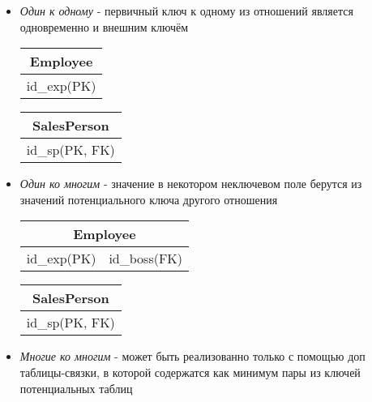 \documentclass[12pt, a4paper]{article}
\begin{document}
\begin{itemize}
    \item \emph{Один к одному} - первичный ключ к одному из отношений является одновременно и внешним ключём
    
    \begin{center}
        \begin{tabular}{|c|}
             \hline Employee \\
             \hline id\_exp(PK) \\
             \hline
        \end{tabular}
        \begin{tabular}{|c|}
             \hline SalesPerson \\
             \hline id\_sp(PK, FK) \\
             \hline
        \end{tabular}
    \end{center}
    
    \item \emph{Один ко многим} - значение в некотором неключевом поле берутся из значений потенциального ключа другого отношения
    
    \begin{center}
        \begin{tabular}{|c|c|}
             \hline \multicolumn{2}{|c|}{Employee} \\
             \hline id\_exp(PK) & id\_boss(FK)\\
             \hline
        \end{tabular}
        \begin{tabular}{|c|}
             \hline SalesPerson \\
             \hline id\_sp(PK, FK) \\
             \hline
        \end{tabular}
    \end{center}
    
    \item \emph{Многие ко многим} - может быть реализованно только с помощью доп таблицы-связки, в которой содержатся как минимум пары из ключей потенциальных таблиц
    

\end{itemize}
\end{document}
